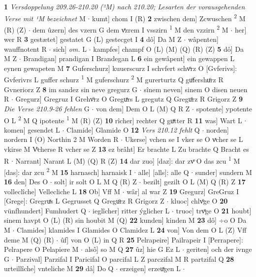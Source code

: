 \documentclass[8pt,a4paper,notitlepage]{article}
\begin{document}
\begin{table}[ht]
\begin{minipage}[t]{0.5\linewidth}
\textbf{1} \textit{Versdoppelung 209.26-210.20 (²M) nach 210.20; Lesarten der vorausgehenden Verse mit ¹M bezeichnet} M   $\cdot$ kumt] chom I (R) \textbf{2} zwischen dem] Zcwuschen \textsuperscript{2}\hspace{-1.3mm} M (R) (Z)  $\cdot$ dem ûzern] des vzern G dem vͤzrem I vsszirn \textsuperscript{1}\hspace{-1.3mm} M den vzzirn \textsuperscript{2}\hspace{-1.3mm} M  $\cdot$ her] wer R \textbf{3} gestætet] gestatet G (L) gestecget I \textbf{4} dô] Da M Z  $\cdot$ wâpenten] wauffnotent R  $\cdot$ sich] \textit{om.} L  $\cdot$ kampfes] champf O (L) (M) (Q) (R) (Z) \textbf{5} dô] Da M Z  $\cdot$ Brandigan] prandigan I Brandegan L \textbf{6} ein gewâpent] ein gewappen L eynen gewapeten M \textbf{7} Guferschurz] kuuerscurz I schvfert schvͦrz O [Gvferivs]: Gvferivrs L guffer schurz \textsuperscript{1}\hspace{-1.3mm} M guferschurz \textsuperscript{2}\hspace{-1.3mm} M gurerturtz Q guͦfershuͦrz R Gvneriorz Z \textbf{8} im sandez sin neve gregurz G  $\cdot$ sînem neven] sinem O disen neuen R  $\cdot$ Gregurz] Gregruz I Grehvͦrz O Greguͯrs L gregutz Q Greguͦrz R Grigorz Z \textbf{9} \textit{Die Verse 210.9-26 fehlen} G   $\cdot$ von dem] Dem O L (M) Q R Z  $\cdot$ spotente] ypotente O L \textsuperscript{2}\hspace{-1.3mm} M Q ipotente \textsuperscript{1}\hspace{-1.3mm} M (R) (Z) \textbf{10} rîcher] rechter Q guͯtter R \textbf{11} was] Wart L  $\cdot$ komen] gesendet L  $\cdot$ Clamide] Glamide O \textbf{12} \textit{Vers 210.12 fehlt} Q   $\cdot$ norden] nordern I (O) Northin 2 M Worden R  $\cdot$ Ukerse] vchen se I vker se O vͯcher se L vkirse M Vͦcherse R vcher se Z \textbf{13} ez brâht] Er brachte L Zu brachte Q Bracht es R  $\cdot$ Narrant] Narant L (M) (Q) R (Z) \textbf{14} dar zuo] [daz]: dar zvͦ O das zcu \textsuperscript{1}\hspace{-1.3mm} M [das]: dar zcu \textsuperscript{2}\hspace{-1.3mm} M \textbf{15} harnasch] harnaisk I  $\cdot$ alle] [alls]: alle Q  $\cdot$ sunder] sundern M \textbf{16} den] Des O  $\cdot$ solt] ir solt O L M Q (R) Z  $\cdot$ bezilt] gezilt O L (M) Q (R) Z \textbf{17} volleclîche] Vellecliche L \textbf{18} Ob] Vff M  $\cdot$ wâr] al war Z \textbf{19} Gregurz] GreGruz I [Grege]: Gregruͯs L Gegrusset Q Greguͦrz R Grigorz Z  $\cdot$ kluoc] chlvͦge O \textbf{20} vünfhundert] Fumhudert Q  $\cdot$ ieglîcher] ritter ýglicher L  $\cdot$ truoc] trvͦge O \textbf{21} houbt] sinem havpt O (L) (R) sin houbit M (Q) \textbf{22} kunden] kinden M \textbf{23} dô] ÷o O Da M  $\cdot$ Clamides] klamides I Glamides O Clamidez L \textbf{24} von] Von dem O L (Z) Vff deme M (Q) (R)  $\cdot$ ûf] von O (L) in Q R \textbf{25} Pelrapeire] Pailrapeir I [Perrapere]: Pelrapere O Pelapiere M  $\cdot$ alsô] so M Q \textbf{27} ûz] hie G Ez L  $\cdot$ geriten] och der ivnge G  $\cdot$ Parzival] Parzifal I Paricifal O parcifal L Z parczifal M R partzifal Q \textbf{28} urteillîche] vnteliche M \textbf{29} dâ] Do Q  $\cdot$ erzeigen] erzeuͯgen L  $\cdot$ 
\end{minipage}
\end{table}
\end{document}
